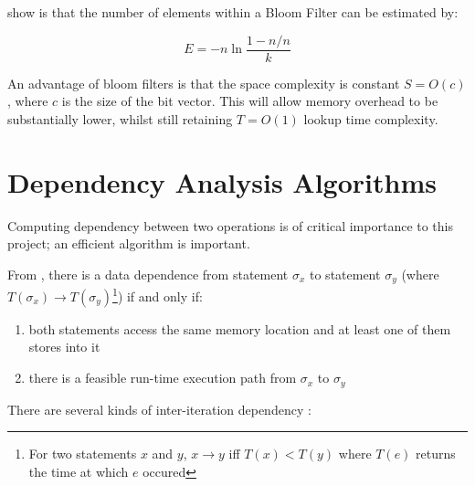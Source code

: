 		\citet{Swamidass2007} show is that the number of elements within a Bloom Filter can be estimated by:
		
		\[
		E = -n \ln \frac{1-n/n}{k}
		\]
		
		An advantage of bloom filters is that the space complexity is constant $S=O(c)$, where $c$ is the size of the bit vector. This will allow memory overhead to be substantially lower, whilst still retaining $T=O(1)$ lookup time complexity.

\section{Dependency Analysis Algorithms} \label{sec:runtime/analysis}
	Computing dependency between two operations is of critical importance to this project; an efficient algorithm is important.
	
	From \citet[p.~37]{Allen2000}, there is a data dependence from statement $\sigma_x$ to statement $\sigma_y$ (where $T(\sigma_x) \rightarrow T(\sigma_y)$\footnote{For two statements $x$ and $y$, $x \rightarrow y$ iff $T(x) < T(y)$ where $T(e)$ returns the time at which $e$ occured}) if and only if:
	
	\begin{enumerate}
		\item both statements access the same memory location and at least one of them stores into it
		\item there is a feasible run-time execution path from $\sigma_x$ to $\sigma_y$
	\end{enumerate}
	
	There are several kinds of inter-iteration dependency \citep[p.~526]{Ibbett2009,ArchitectureBook}:
	
